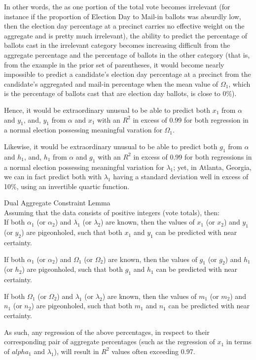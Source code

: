 In other words, the as one portion of the total vote becomes irrelevant (for instance if the proportion of Election Day to Mail-in ballots was absurdly low, then the election day percentage at a precinct carries no effective weight on the aggregate and is pretty much irrelevant), the ability to predict the percentage of ballots cast in the irrelevant category becomes increasing difficult from the aggregate percentage and the percentage of ballots in the other category (that is, from the example in the prior set of parentheses, it would become nearly impossible to predict a candidate's election day percentage at a precinct from the candidate's aggregated and mail-in percentage when the mean value of $\Omega_{1}$, which is the percentage of ballots cast that are election day ballots, is close to 0\%).

Hence, it would be extraordinary unusual to be able to predict both $x_{1}$ from $\alpha$ and $y_{1}$, and, $y_{1}$ from $\alpha$ and $x_{1}$ with an $R^2$ in excess of 0.99 for both regression in a normal election possessing meaningful varation for $\Omega_{1}$.

Likewise, it would be extraordinary unusual to be able to predict both $g_{1}$ from $\alpha$ and $h_{1}$, and, $h_{1}$ from $\alpha$ and $g_{1}$ with an $R^2$ in excess of 0.99 for both regressions in a normal election possessing meaningful variation for $\lambda_{1}$; yet, in Atlanta, Georgia, we can in fact predict both with $\lambda_{1}$ having a standard deviation well in excess of 10\%, using an invertible quartic function.
\newpage
\begin{lemma}{Dual Aggregate Constraint Lemma}\\
Assuming that the data consists of positive integers (vote totals), then:\\

If both $\alpha_{1}$ (or $\alpha_{2}$) and $\lambda_{1}$ (or $\lambda_{2}$) are known, then the values of $x_{1}$ (or $x_{2}$) and $y_{1}$ (or $y_{2}$) are pigeonholed, such that both $x_{1}$ and $y_{1}$ can be predicted with near certainty.

If both $\alpha_{1}$ (or $\alpha_{2}$) and $\Omega_{1}$ (or $\Omega_{2}$) are known, then the values of $g_{1}$ (or $g_{2}$) and $h_{1}$ (or $h_{2}$) are pigeonholed, such that both $g_{1}$ and $h_{1}$ can be predicted with near certainty.

If both $\Omega_{1}$ (or $\Omega_{2}$) and $\lambda_{1}$ (or $\lambda_{2}$) are known, then the values of $m_{1}$ (or $m_{2}$) and $n_{1}$ (or $n_{2}$) are pigeonholed, such that both $m_{1}$ and $n_{1}$ can be predicted with near certainty.

As such, any regression of the above percentages, in respect to their corresponding pair of aggregate percentages (such as the regression of $x_{1}$ in terms of $alpha_{1}$ and $\lambda_{1}$), will result in $R^2$ values often exceeding 0.97.
\end{lemma}

